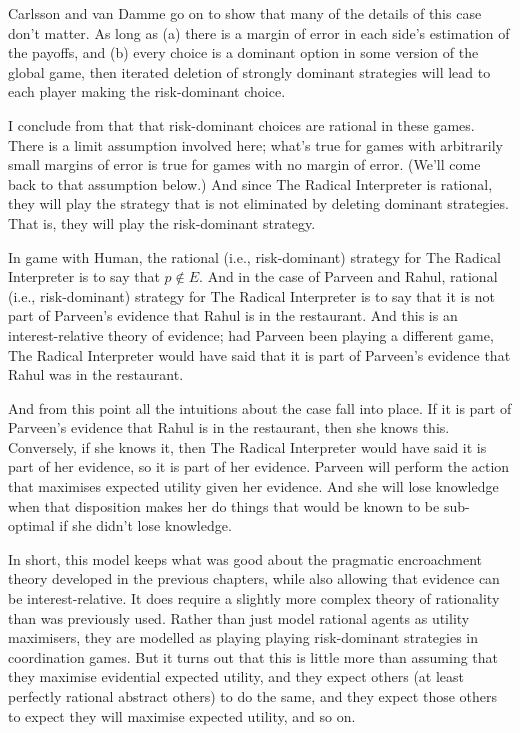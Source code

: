 \documentclass[11pt,]{book}
\begin{document}
Carlsson and van Damme go on to show that many of the details of this case don't matter. As long as (a) there is a margin of error in each side's estimation of the payoffs, and (b) every choice is a dominant option in some version of the global game, then iterated deletion of strongly dominant strategies will lead to each player making the risk-dominant choice.

I conclude from that that risk-dominant choices are rational in these games. There is a limit assumption involved here; what's true for games with arbitrarily small margins of error is true for games with no margin of error. (We'll come back to that assumption below.) And since The Radical Interpreter is rational, they will play the strategy that is not eliminated by deleting dominant strategies. That is, they will play the risk-dominant strategy.

In game with Human, the rational (i.e., risk-dominant) strategy for The Radical Interpreter is to say that \(p \notin E\). And in the case of Parveen and Rahul, rational (i.e., risk-dominant) strategy for The Radical Interpreter is to say that it is not part of Parveen's evidence that Rahul is in the restaurant. And this is an interest-relative theory of evidence; had Parveen been playing a different game, The Radical Interpreter would have said that it is part of Parveen's evidence that Rahul was in the restaurant.

And from this point all the intuitions about the case fall into place. If it is part of Parveen's evidence that Rahul is in the restaurant, then she knows this. Conversely, if she knows it, then The Radical Interpreter would have said it is part of her evidence, so it is part of her evidence. Parveen will perform the action that maximises expected utility given her evidence. And she will lose knowledge when that disposition makes her do things that would be known to be sub-optimal if she didn't lose knowledge.

In short, this model keeps what was good about the pragmatic encroachment theory developed in the previous chapters, while also allowing that evidence can be interest-relative. It does require a slightly more complex theory of rationality than was previously used. Rather than just model rational agents as utility maximisers, they are modelled as playing playing risk-dominant strategies in coordination games. But it turns out that this is little more than assuming that they maximise evidential expected utility, and they expect others (at least perfectly rational abstract others) to do the same, and they expect those others to expect they will maximise expected utility, and so on.
\end{document}
